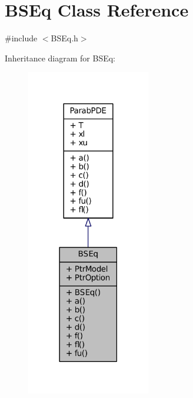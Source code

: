 \hypertarget{classBSEq}{\section{B\+S\+Eq Class Reference}
\label{classBSEq}
}


{\ttfamily \#include $<$B\+S\+Eq.\+h$>$}



Inheritance diagram for B\+S\+Eq\+:\nopagebreak
\begin{figure}[H]
\begin{center}
\leavevmode
\includegraphics[width=153pt]{classBSEq__inherit__graph}
\end{center}
\end{figure}


